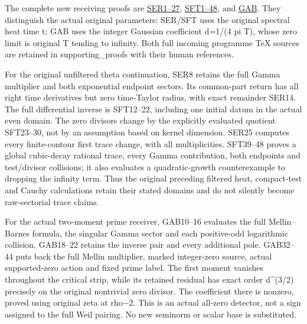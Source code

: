 \documentclass[
  10pt,
  a4paper,
]{article}
\begin{document}
The complete new receiving proofs are
\href{SECTORIAL_ENDPOINT_ZERO_TRACE_RETURN.md}{SER1--27},
\href{SECTORIAL_FILTER_TRACE_DERIVATION.md}{SFT1--48}, and
\href{GAUSSIAN_ARITHMETIC_BOUNDARY_RETURN.md}{GAB}. They distinguish the
actual original parameters: SER/SFT uses the original spectral heat time
t; GAB uses the integer Gaussian coefficient d=1/(4 pi T), whose zero
limit is original T tending to infinity. Both full incoming programme
TeX sources are retained in supporting\_proofs with their human
references.

For the original unfiltered theta continuation, SER8 retains the full
Gamma multiplier and both exponential endpoint sectors. Its common-part
return has all right time derivatives but zero time-Taylor radius, with
exact remainder SER14. The full differential inverse is SFT12--22,
including one initial datum in the actual even domain. The zero divisors
change by the explicitly evaluated quotient SFT23--30, not by an
assumption based on kernel dimension. SER25 computes every
finite-contour first trace change, with all multiplicities. SFT39--48
proves a global cubic-decay rational trace, every Gamma contribution,
both endpoints and test/divisor collisions; it also evaluates a
quadratic-growth counterexample to dropping the infinity term. Thus the
original preceding filtered heat, compact-test and Cauchy calculations
retain their stated domains and do not silently become raw-sectorial
trace claims.

For the actual two-moment prime receiver, GAB10--16 evaluates the full
Mellin--Barnes formula, the singular Gamma sector and each positive-odd
logarithmic collision. GAB18--22 retains the inverse pair and every
additional pole. GAB32--44 puts back the full Mellin multiplier, marked
integer-zero source, actual supported-zero action and fixed prime label.
The first moment vanishes throughout the critical strip, while its
retained residual has exact order d\^{}(3/2) precisely on the original
nontrivial zero divisor. The coefficient there is nonzero, proved using
original zeta at rho−2. This is an actual all-zero detector, not a sign
assigned to the full Weil pairing. No new seminorm or scalar base is
substituted.
\end{document}
